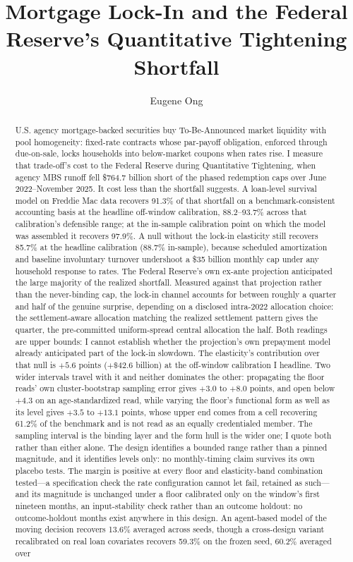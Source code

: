 \documentclass[12pt]{article}
\title{Mortgage Lock-In and the Federal Reserve's Quantitative Tightening Shortfall}
\author{Eugene Ong}
\affil{Carnegie Mellon University}
\date{}
\begin{document}
\maketitle
\begin{abstract}
\noindent U.S. agency mortgage-backed securities buy To-Be-Announced market liquidity with pool homogeneity: fixed-rate contracts whose par-payoff obligation, enforced through due-on-sale, locks households into below-market coupons when rates rise. I measure that trade-off's cost to the Federal Reserve during Quantitative Tightening, when agency MBS runoff fell \$764.7 billion short of the phased redemption caps over June 2022--November 2025. It cost less than the shortfall suggests. A loan-level survival model on Freddie Mac data recovers 91.3\% of that shortfall on a benchmark-consistent accounting basis at the headline off-window calibration, 88.2--93.7\% across that calibration's defensible range; at the in-sample calibration point on which the model was assembled it recovers 97.9\%. A null without the lock-in elasticity still recovers 85.7\% at the headline calibration (88.7\% in-sample), because scheduled amortization and baseline involuntary turnover undershoot a \$35 billion monthly cap under any household response to rates. The Federal Reserve's own ex-ante projection anticipated the large majority of the realized shortfall. Measured against that projection rather than the never-binding cap, the lock-in channel accounts for between roughly a quarter and half of the genuine surprise, depending on a disclosed intra-2022 allocation choice: the settlement-aware allocation matching the realized settlement pattern gives the quarter, the pre-committed uniform-spread central allocation the half. Both readings are upper bounds: I cannot establish whether the projection's own prepayment model already anticipated part of the lock-in slowdown. The elasticity's contribution over that null is $+5.6$ points ($+\$42.6$ billion) at the off-window calibration I headline. Two wider intervals travel with it and neither dominates the other: propagating the floor reads' own cluster-bootstrap sampling error gives $+3.0$ to $+8.0$ points, and open below $+4.3$ on an age-standardized read, while varying the floor's functional form as well as its level gives $+3.5$ to $+13.1$ points, whose upper end comes from a cell recovering 61.2\% of the benchmark and is not read as an equally credentialed member. The sampling interval is the binding layer and the form hull is the wider one; I quote both rather than either alone. The design identifies a bounded range rather than a pinned magnitude, and it identifies levels only: no monthly-timing claim survives its own placebo tests. The margin is positive at every floor and elasticity-band combination tested---a specification check the rate configuration cannot let fail, retained as such---and its magnitude is unchanged under a floor calibrated only on the window's first nineteen months, an input-stability check rather than an outcome holdout: no outcome-holdout months exist anywhere in this design. An agent-based model of the moving decision recovers 13.6\% averaged across seeds, though a cross-design variant recalibrated on real loan covariates recovers 59.3\% on the frozen seed, 60.2\% averaged over 
\end{abstract}
\end{document}
